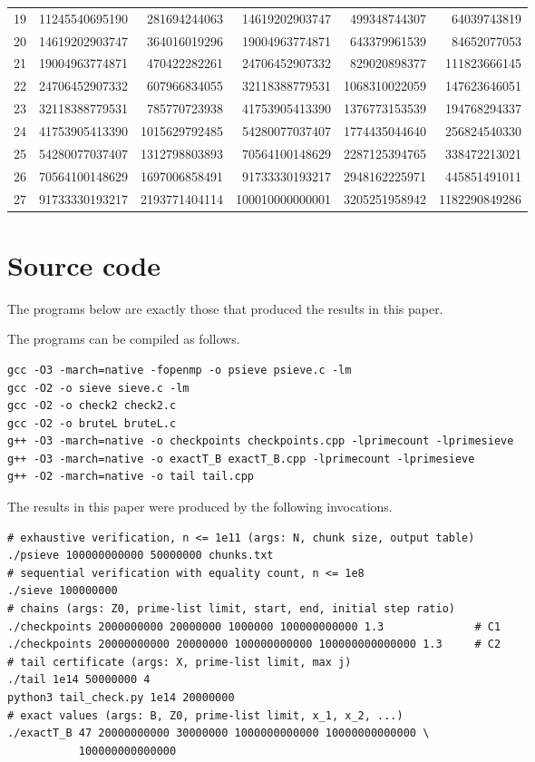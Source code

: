 \documentclass[11pt,a4paper]{article}
\theoremstyle{definition}
\begin{document}
{\begin{longtable}{rrrrrr}
19 & 11245540695190 & 281694244063 & 14619202903747 & 499348744307 & 64039743819 \\
20 & 14619202903747 & 364016019296 & 19004963774871 & 643379961539 & 84652077053 \\
21 & 19004963774871 & 470422282261 & 24706452907332 & 829020898377 & 111823666145 \\
22 & 24706452907332 & 607966834055 & 32118388779531 & 1068310022059 & 147623646051 \\
23 & 32118388779531 & 785770723938 & 41753905413390 & 1376773153539 & 194768294337 \\
24 & 41753905413390 & 1015629792485 & 54280077037407 & 1774435044640 & 256824540330 \\
25 & 54280077037407 & 1312798803893 & 70564100148629 & 2287125394765 & 338472213021 \\
26 & 70564100148629 & 1697006858491 & 91733330193217 & 2948162225971 & 445851491011 \\
27 & 91733330193217 & 2193771404114 & 100010000000001 & 3205251958942 & 1182290849286 \\
\bottomrule
\end{longtable}
}

\section{Source code}\label{app:code}

The programs below are exactly those that produced the results in this paper.

The programs can be compiled as follows.
{\footnotesize
\begin{verbatim}
gcc -O3 -march=native -fopenmp -o psieve psieve.c -lm
gcc -O2 -o sieve sieve.c -lm
gcc -O2 -o check2 check2.c
gcc -O2 -o bruteL bruteL.c
g++ -O3 -march=native -o checkpoints checkpoints.cpp -lprimecount -lprimesieve
g++ -O3 -march=native -o exactT_B exactT_B.cpp -lprimecount -lprimesieve
g++ -O2 -march=native -o tail tail.cpp
\end{verbatim}
}
The results in this paper were produced by the following invocations.
{\footnotesize
\begin{verbatim}
# exhaustive verification, n <= 1e11 (args: N, chunk size, output table)
./psieve 100000000000 50000000 chunks.txt
# sequential verification with equality count, n <= 1e8
./sieve 100000000
# chains (args: Z0, prime-list limit, start, end, initial step ratio)
./checkpoints 2000000000 20000000 1000000 100000000000 1.3              # C1
./checkpoints 20000000000 20000000 100000000000 100000000000000 1.3     # C2
# tail certificate (args: X, prime-list limit, max j)
./tail 1e14 50000000 4
python3 tail_check.py 1e14 20000000
# exact values (args: B, Z0, prime-list limit, x_1, x_2, ...)
./exactT_B 47 20000000000 30000000 1000000000000 10000000000000 \
           100000000000000
\end{verbatim}
}
\end{document}
